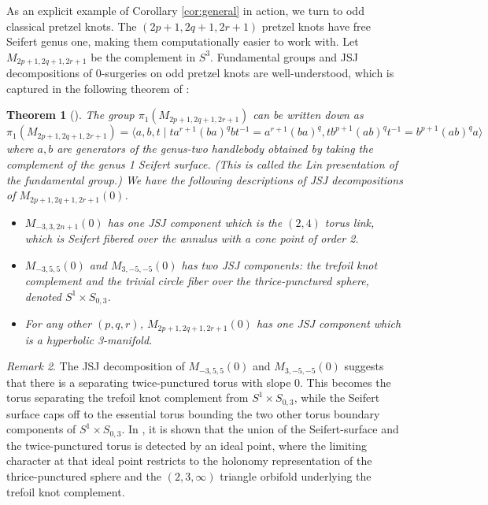 \documentclass{article}
\theoremstyle{plain}
\newtheorem{theorem}{Theorem}[section]
\theoremstyle{definition}
\theoremstyle{plain}
\theoremstyle{plain}
\theoremstyle{plain}
\theoremstyle{remark}
\newtheorem{remark}[theorem]{Remark}
\theoremstyle{remark}
\theoremstyle{plain}
\theoremstyle{plain}
\begin{document}
As an explicit example of Corollary \ref{cor:general} in action, we turn to odd classical pretzel knots. The $(2p+1, 2q+1, 2r+1)$ pretzel knots have free Seifert genus one, making them computationally easier to work with. Let $M_{2p+1, 2q+1, 2r+1}$ be the complement in $S^3$. Fundamental groups and JSJ decompositions of 0-surgeries on odd pretzel knots are well-understood, which is captured in the following theorem of \cite{sekino}:

\begin{theorem}[\cite{sekino}]
The group $\pi_1(M_{2p+1, 2q+1, 2r+1})$ can be written down as
\begin{equation}
	\pi_1(M_{2p+1, 2q+1, 2r+1}) = \langle a, b, t \mid ta^{r+1}(ba)^qbt^{-1} = a^{r+1}(ba)^q, tb^{p+1}(ab)^qt^{-1} = b^{p+1}(ab)^qa \rangle
\end{equation}
where $a, b$ are generators of the genus-two handlebody obtained by taking the complement of the genus 1 Seifert surface. (This is called the \emph{Lin presentation} of the fundamental group.) We have the following descriptions of JSJ decompositions of $M_{2p+1, 2q+1, 2r+1}(0)$. 
\begin{itemize}
	\item $M_{-3, 3, 2n+1}(0)$ has one JSJ component which is the $(2, 4)$ torus link, which is Seifert fibered over the annulus with a cone point of order 2.
	\item $M_{-3, 5, 5}(0)$ and $M_{3, -5, -5}(0)$ has two JSJ components: the trefoil knot complement and the trivial circle fiber over the thrice-punctured sphere, denoted $S^1 \times S_{0, 3}$. 
	\item For any other $(p, q, r)$, $M_{2p+1, 2q+1, 2r+1}(0)$ has one JSJ component which is a hyperbolic 3-manifold. 
\end{itemize}
\end{theorem}

\begin{remark}
The JSJ decomposition of $M_{-3, 5, 5}(0)$ and $M_{3, -5, -5}(0)$ suggests that there is a separating twice-punctured torus with slope 0. This becomes the torus separating the trefoil knot complement from $S^1 \times S_{0, 3}$, while the Seifert surface caps off to the essential torus bounding the two other torus boundary components of $S^1 \times S_{0, 3}$. In \cite{twicepunctured}, it is shown that the union of the Seifert-surface and the twice-punctured torus is detected by an ideal point, where the limiting character at that ideal point restricts to the holonomy representation of the thrice-punctured sphere and the $(2, 3, \infty)$ triangle orbifold underlying the trefoil knot complement. 
\end{remark}
\end{document}
